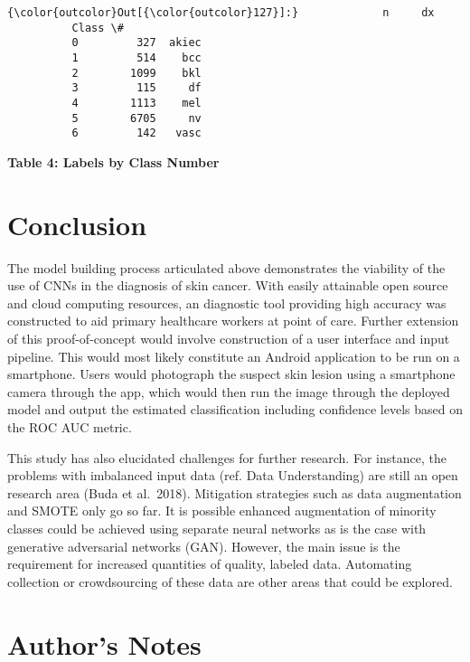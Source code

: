 \documentclass[11pt]{article}
\begin{document}
\begin{Verbatim}[commandchars=\\\{\}]
{\color{outcolor}Out[{\color{outcolor}127}]:}             n     dx
          Class \#             
          0         327  akiec
          1         514    bcc
          2        1099    bkl
          3         115     df
          4        1113    mel
          5        6705     nv
          6         142   vasc
\end{Verbatim}
            
    \textbf{Table 4: Labels by Class Number}

    \hypertarget{conclusion}{%
\section{Conclusion}\label{conclusion}}

The model building process articulated above demonstrates the viability
of the use of CNNs in the diagnosis of skin cancer. With easily
attainable open source and cloud computing resources, an diagnostic tool
providing high accuracy was constructed to aid primary healthcare
workers at point of care. Further extension of this proof-of-concept
would involve construction of a user interface and input pipeline. This
would most likely constitute an Android application to be run on a
smartphone. Users would photograph the suspect skin lesion using a
smartphone camera through the app, which would then run the image
through the deployed model and output the estimated classification
including confidence levels based on the ROC AUC metric.

This study has also elucidated challenges for further research. For
instance, the problems with imbalanced input data (ref. Data
Understanding) are still an open research area (Buda et al.~2018).
Mitigation strategies such as data augmentation and SMOTE only go so
far. It is possible enhanced augmentation of minority classes could be
achieved using separate neural networks as is the case with generative
adversarial networks (GAN). However, the main issue is the requirement
for increased quantities of quality, labeled data. Automating collection
or crowdsourcing of these data are other areas that could be explored.

    \hypertarget{authors-notes}{%
\section{Author's Notes}\label{authors-notes}}
\end{document}
